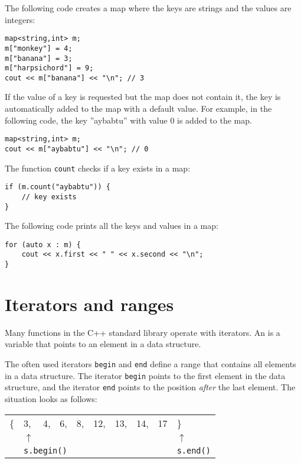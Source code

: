 The following code creates a map
where the keys are strings and the values are integers:

\begin{lstlisting}
map<string,int> m;
m["monkey"] = 4;
m["banana"] = 3;
m["harpsichord"] = 9;
cout << m["banana"] << "\n"; // 3
\end{lstlisting}

If the value of a key is requested
but the map does not contain it,
the key is automatically added to the map with
a default value.
For example, in the following code,
the key ''aybabtu'' with value 0
is added to the map.

\begin{lstlisting}
map<string,int> m;
cout << m["aybabtu"] << "\n"; // 0
\end{lstlisting}
The function \texttt{count} checks
if a key exists in a map:
\begin{lstlisting}
if (m.count("aybabtu")) {
    // key exists
}
\end{lstlisting}
The following code prints all the keys and values
in a map:
\begin{lstlisting}
for (auto x : m) {
    cout << x.first << " " << x.second << "\n";
}
\end{lstlisting}

\section{Iterators and ranges}


Many functions in the C++ standard library
operate with iterators.
An  is a variable that points
to an element in a data structure.

The often used iterators \texttt{begin}
and \texttt{end} define a range that contains
all elements in a data structure.
The iterator \texttt{begin} points to
the first element in the data structure,
and the iterator \texttt{end} points to
the position \emph{after} the last element.
The situation looks as follows:

\begin{center}
\begin{tabular}{llllllllll}
\{ & 3, & 4, & 6, & 8, & 12, & 13, & 14, & 17 & \} \\
& $\uparrow$ & & & & & & & & $\uparrow$ \\
& \multicolumn{3}{l}{\texttt{s.begin()}} & & & & & & \texttt{s.end()} \\
\end{tabular}
\end{center}

